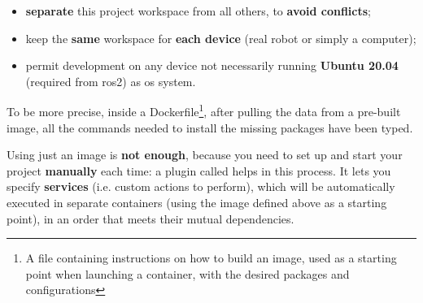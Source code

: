 \begin{itemize}
    \item \textbf{separate} this project workspace from all others, to \textbf{avoid conflicts};
    \item keep the \textbf{same} workspace for \textbf{each device} (real robot or simply a computer);
    \item permit development on any device not necessarily running \textbf{Ubuntu 20.04} (required from \acrshort{ros}2) as \acrshort{os} system.
\end{itemize}

To be more precise, inside a Dockerfile\footnote{A file containing instructions on how to build an image, used as a starting point when launching a container, with the desired packages and configurations}, after pulling the data from a pre-built image\cite{dockerimage}, all the commands needed to install the missing packages have been typed.

Using just an image is \textbf{not enough}, because you need to set up and start your project \textbf{manually} each time: a plugin called  helps in this process. It lets you specify \textbf{services} (i.e. custom actions to perform), which  will be automatically executed in separate containers (using the image defined above as a starting point), in an order that meets their mutual dependencies.